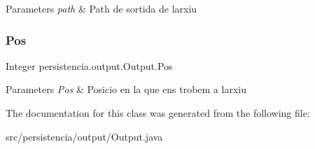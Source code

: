 \begin{DoxyParams}{Parameters}
{\em path} & Path de sortida de l\textquotesingle{}arxiu \\
\hline
\end{DoxyParams}
\mbox{\label{classpersistencia_1_1output_1_1Output_a3709182600423f7e57644ccdd0016f22}} 
\subsubsection{\texorpdfstring{Pos}{Pos}}
{\footnotesize\ttfamily Integer persistencia.\+output.\+Output.\+Pos\hspace{0.3cm}{\ttfamily [package]}}


\begin{DoxyParams}{Parameters}
{\em Pos} & Posicio en la que ens trobem a l\textquotesingle{}arxiu \\
\hline
\end{DoxyParams}


The documentation for this class was generated from the following file\+:\begin{DoxyCompactItemize}
\item 
src/persistencia/output/Output.\+java\end{DoxyCompactItemize}
